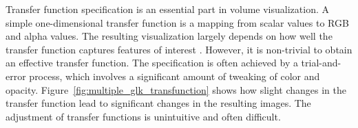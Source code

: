 Transfer function specification is an essential part in volume visualization.
A simple one-dimensional transfer function is a mapping from scalar values to RGB and alpha values.
The resulting visualization largely depends on how well the transfer function captures features of interest \cite{kniss_multidimensional_2002}.
However, it is non-trivial to obtain an effective transfer function. The specification is often achieved by a trial-and-error process, which involves a significant amount of tweaking of color and opacity. Figure~\ref{fig:multiple_glk_transfunction} shows how slight changes in the transfer function lead to significant changes in the resulting images. The adjustment of transfer functions is unintuitive and often difficult.

